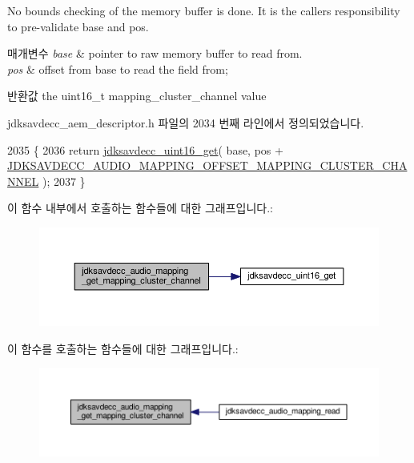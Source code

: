No bounds checking of the memory buffer is done. It is the caller\textquotesingle{}s responsibility to pre-\/validate base and pos.


\begin{DoxyParams}{매개변수}
{\em base} & pointer to raw memory buffer to read from. \\
\hline
{\em pos} & offset from base to read the field from; \\
\hline
\end{DoxyParams}
\begin{DoxyReturn}{반환값}
the uint16\+\_\+t mapping\+\_\+cluster\+\_\+channel value 
\end{DoxyReturn}


jdksavdecc\+\_\+aem\+\_\+descriptor.\+h 파일의 2034 번째 라인에서 정의되었습니다.


\begin{DoxyCode}
2035 \{
2036     \textcolor{keywordflow}{return} \hyperlink{group__endian_ga3fbbbc20be954aa61e039872965b0dc9}{jdksavdecc\_uint16\_get}( base, pos + 
      \hyperlink{group__audio__mapping_ga625a930d4963bce1d448347efdd150ce}{JDKSAVDECC\_AUDIO\_MAPPING\_OFFSET\_MAPPING\_CLUSTER\_CHANNEL}
       );
2037 \}
\end{DoxyCode}


이 함수 내부에서 호출하는 함수들에 대한 그래프입니다.\+:
\nopagebreak
\begin{figure}[H]
\begin{center}
\leavevmode
\includegraphics[width=350pt]{group__audio__mapping_ga84394f6ee3d78cb732f62a698c25ca6d_cgraph}
\end{center}
\end{figure}




이 함수를 호출하는 함수들에 대한 그래프입니다.\+:
\nopagebreak
\begin{figure}[H]
\begin{center}
\leavevmode
\includegraphics[width=350pt]{group__audio__mapping_ga84394f6ee3d78cb732f62a698c25ca6d_icgraph}
\end{center}
\end{figure}


